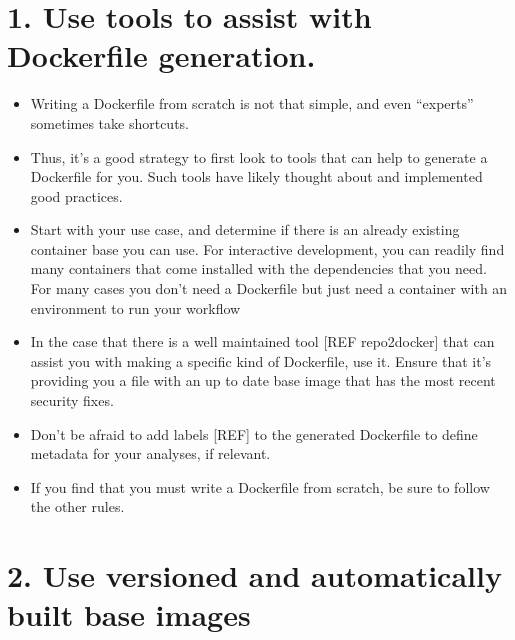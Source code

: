 \documentclass[10pt,letterpaper]{article}
\providecommand{\tightlist}{%
  \setlength{\itemsep}{0pt}\setlength{\parskip}{0pt}}
\begin{document}
\hypertarget{use-tools-to-assist-with-dockerfile-generation.}{%
\section*{1. Use tools to assist with Dockerfile
generation.}\label{use-tools-to-assist-with-dockerfile-generation.}}

\begin{itemize}
\tightlist
\item
  Writing a Dockerfile from scratch is not that simple, and even
  ``experts'' sometimes take shortcuts.
\item
  Thus, it's a good strategy to first look to tools that can help to
  generate a Dockerfile for you. Such tools have likely thought about
  and implemented good practices.
\item
  Start with your use case, and determine if there is an already
  existing container base you can use. For interactive development, you
  can readily find many containers that come installed with the
  dependencies that you need. For many cases you don't need a Dockerfile
  but just need a container with an environment to run your workflow
\item
  In the case that there is a well maintained tool {[}REF repo2docker{]}
  that can assist you with making a specific kind of Dockerfile, use it.
  Ensure that it's providing you a file with an up to date base image
  that has the most recent security fixes.
\item
  Don't be afraid to add labels {[}REF{]} to the generated Dockerfile to
  define metadata for your analyses, if relevant.
\item
  If you find that you must write a Dockerfile from scratch, be sure to
  follow the other rules.
\end{itemize}

\hypertarget{use-versioned-and-automatically-built-base-images}{%
\section*{2. Use versioned and automatically built base
images}\label{use-versioned-and-automatically-built-base-images}}
\end{document}
